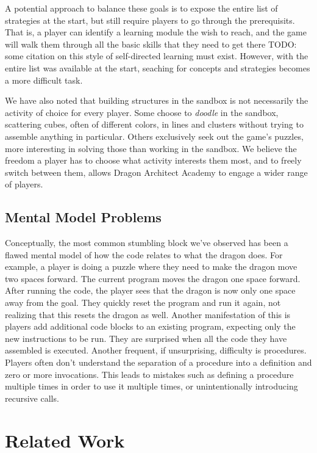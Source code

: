 \documentclass{sig-alternate}
\newcommand{\TODO}[1]{{\color{red} TODO: #1}}
\newcommand{\gametitle}{{\color{RoyalPurple} Dragon Architect Academy}}
\begin{document}
A potential approach to balance these goals is to expose the entire list of strategies at the start, but still require players to go through the prerequisits.
That is, a player can identify a learning module the wish to reach, and the game will walk them through all the basic skills that they need to get there \TODO{some citation on this style of self-directed learning must exist}.
However, with the entire list was available at the start, seaching for concepts and strategies becomes a more difficult task.

We have also noted that building structures in the sandbox is not necessarily the activity of choice for every player. 
Some choose to \emph{doodle} in the sandbox, scattering cubes, often of different colors, in lines and clusters without trying to assemble anything in particular.
Others exclusively seek out the game's puzzles, more interesting in solving those than working in the sandbox.
We believe the freedom a player has to choose what activity interests them most, and to freely switch between them, allows \gametitle{} to engage a wider range of players.

\subsection{Mental Model Problems}

Conceptually, the most common stumbling block we've observed has been a flawed mental model of how the code relates to what the dragon does. 
For example, a player is doing a puzzle where they need to make the dragon move two spaces forward. 
The current program moves the dragon one space forward. 
After running the code, the player sees that the dragon is now only one space away from the goal. 
They quickly reset the program and run it again, not realizing that this resets the dragon as well. 
Another manifestation of this is players add additional code blocks to an existing program, expecting only the new instructions to be run. 
They are surprised when all the code they have assembled is executed. 
Another frequent, if unsurprising, difficulty is procedures. 
Players often don't understand the separation of a procedure into a definition and zero or more invocations. 
This leads to mistakes such as defining a procedure multiple times in order to use it multiple times, or unintentionally introducing recursive calls. 

\section{Related Work}
\end{document}
